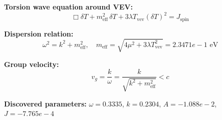 
\textbf{Torsion wave equation around VEV:}
\begin{equation}
  \Box \delta T + m_{\text{eff}}^2 \, \delta T + 3\lambda T_{\text{vev}} (\delta T)^2 = J_{\text{spin}}
\end{equation}

\textbf{Dispersion relation:}
\begin{equation}
  \omega^2 = k^2 + m_{\text{eff}}^2, \quad
  m_{\text{eff}} = \sqrt{4\mu^2 + 3\lambda T_{\text{vev}}^2} = 2.3471e-1 \text{ eV}
\end{equation}

\textbf{Group velocity:}
\begin{equation}
  v_g = \frac{k}{\omega} = \frac{k}{\sqrt{k^2 + m_{\text{eff}}^2}} < c
\end{equation}

\textbf{Discovered parameters:}
$\omega = 0.3335$, \quad
$k = 0.2304$, \quad
$A = -1.088e-2$, \quad
$J = -7.765e-4$